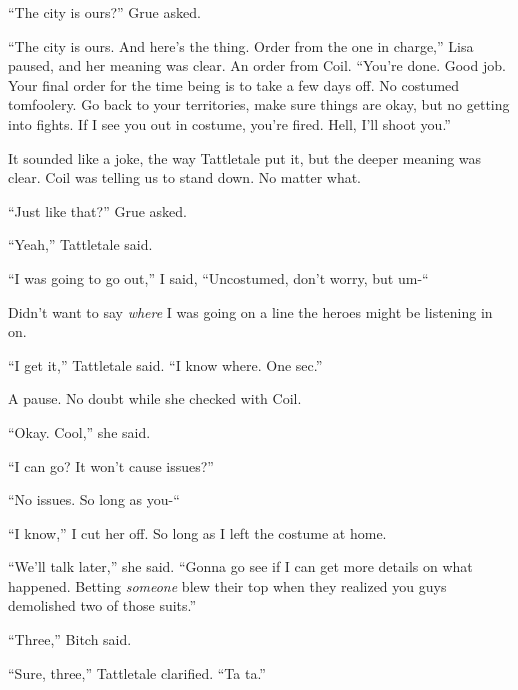 ``The city is ours?'' Grue asked.



``The city is ours.  And here's the thing.  Order from the one in charge,'' Lisa paused, and her meaning was clear.  An order from Coil.  ``You're done.  Good job.  Your final order for the time being is to take a few days off.  No costumed tomfoolery.  Go back to your territories, make sure things are okay, but no getting into fights.  If I see you out in costume, you're fired.  Hell, I'll shoot you.''



It sounded like a joke, the way Tattletale put it, but the deeper meaning was clear.  Coil was telling us to stand down.  No matter what.



``Just like that?'' Grue asked.



``Yeah,'' Tattletale said.



``I was going to go out,'' I said, ``Uncostumed, don't worry, but um-``



Didn't want to say \emph{where} I was going on a line the heroes might be listening in on.



``I get it,'' Tattletale said.  ``I know where.  One sec.''



A pause.  No doubt while she checked with Coil.



``Okay.  Cool,'' she said.



``I can go?  It won't cause issues?''



``No issues.  So long as you-``



``I know,'' I cut her off.  So long as I left the costume at home.



``We'll talk later,'' she said.  ``Gonna go see if I can get more details on what happened.  Betting \emph{someone} blew their top when they realized you guys demolished two of those suits.''



``Three,'' Bitch said.



``Sure, three,'' Tattletale clarified.  ``Ta ta.''



